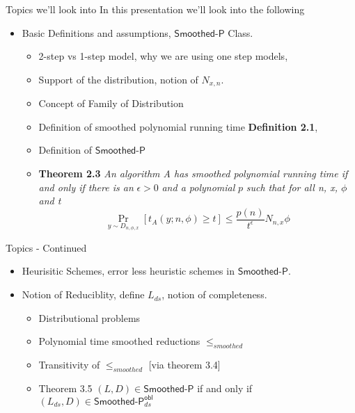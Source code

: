 \begin{frame}{Topics we'll look into}
    In this presentation we'll look into the following
    \begin{itemize}
        \item Basic Definitions and assumptions, $\textsf{Smoothed-P}$ Class.
            \begin{itemize}
                \item 2-step vs 1-step model, why we are using one step models,
                \item Support of the distribution, notion of $N_{x, n}$.
                \item Concept of Family of Distribution
                \item Definition of smoothed polynomial running time \textbf{Definition 2.1},
                \item Definition of $\textsf{Smoothed-P}$
                \item \textbf{Theorem 2.3} \textit{An algorithm A has smoothed polynomial running time if and only if there is an} $\epsilon > 0$ \textit{and a polynomial} $p$ \textit{such that for all n, x, $\phi$ and t} $$\Pr_{y \sim D_{n, \phi, x}}[t_A(y; n, \phi) \geq t] \leq \frac{p(n)}{t^\epsilon} N_{n, x} \phi$$
            \end{itemize}
    \end{itemize}

\end{frame}

\begin{frame}{Topics - Continued}
    \begin{itemize}
        \item Heurisitic Schemes, error less heuristic schemes in $\textsf{Smoothed-P}$.
        \item Notion of Reduciblity, define $L_{ds}$, notion of completeness.
            \begin{itemize}
                \item Distributional problems
                \item Polynomial time smoothed reductions $\leq_{smoothed}$
                \item Transitivity of $\leq_{smoothed}$ [via theorem 3.4]
                \item Theorem 3.5 $(L, D) \in \textsf{Smoothed-P}$ if and only if $(L_{ds}, D) \in \textsf{Smoothed-P}^{\textsf{obl}} _{ds}$
            \end{itemize}
    \end{itemize}
\end{frame}


